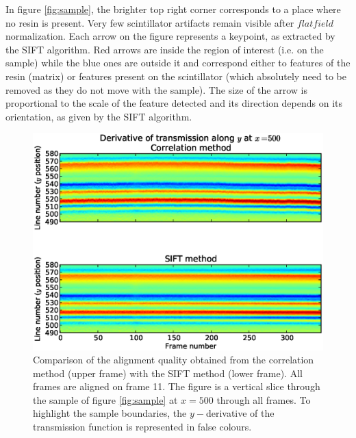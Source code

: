 \documentclass[preprint]{iucr}
\begin{document}
In figure \ref{fig:sample}, the brighter top right corner corresponds
to a place where no resin is present. Very few scintillator artifacts remain visible after $flat
field$ normalization.
Each arrow on the figure represents a keypoint, as extracted by the SIFT
algorithm. Red arrows are inside the region of interest (i.e. on the
sample) while the blue ones are outside it and
correspond either to features of the resin (matrix) or features present on
the scintillator (which absolutely need to be removed as they do not move
with the sample).
The size of the arrow is proportional to the scale of the feature
detected and its direction depends on its orientation, as given by the SIFT algorithm.

\begin{figure}
\label{fig:alignment}
\begin{center}
\includegraphics[width=15cm]{alignment_h.eps}
\caption{Comparison of the alignment quality obtained from the correlation
method (upper frame) with the SIFT method (lower frame). All frames are aligned
on frame 11. The figure is a vertical slice through the sample of figure
\ref{fig:sample} at $x=500$ through all frames. To highlight the sample
boundaries, the $y-$derivative of the transmission function is represented in
false colours.}
\end{center}
\end{figure}
\end{document}
